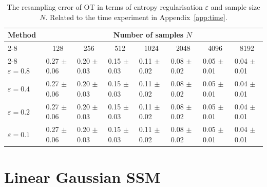 \documentclass{article}
\begin{document}
\begin{table}[t!]
    \caption{The resampling error of OT in terms of entropy regularisation $\varepsilon$ and sample size $N$. 
    Related to the time experiment in Appendix~\ref{app:time}.}
    \label{tbl:time-err-ot}
    \centering
    \begin{tabular}{@{}llllllll@{}}
    \toprule
    \multirow{2}{*}{Method}  & \multicolumn{7}{c}{Number of samples $N$}                                                                                                                                               \\ \cmidrule(l){2-8} 
                      & \multicolumn{1}{c}{128} & \multicolumn{1}{c}{256} & \multicolumn{1}{c}{512} & \multicolumn{1}{c}{1024} & \multicolumn{1}{c}{2048} & \multicolumn{1}{c}{4096} & \multicolumn{1}{c}{8192} \\ \cmidrule(l){2-8} 
    $\varepsilon=0.8$ & 0.27 $\pm$ 0.06         & 0.20 $\pm$ 0.03         & 0.15 $\pm$ 0.03         & 0.11 $\pm$ 0.02          & 0.08 $\pm$ 0.02          & 0.05 $\pm$ 0.01          & 0.04 $\pm$ 0.01          \\
    $\varepsilon=0.4$ & 0.27 $\pm$ 0.06         & 0.20 $\pm$ 0.03         & 0.15 $\pm$ 0.03         & 0.11 $\pm$ 0.02          & 0.08 $\pm$ 0.02          & 0.05 $\pm$ 0.01          & 0.04 $\pm$ 0.01          \\
    $\varepsilon=0.2$ & 0.27 $\pm$ 0.06         & 0.20 $\pm$ 0.03         & 0.15 $\pm$ 0.03         & 0.11 $\pm$ 0.02          & 0.08 $\pm$ 0.02          & 0.05 $\pm$ 0.01          & 0.04 $\pm$ 0.01          \\
    $\varepsilon=0.1$ & 0.27 $\pm$ 0.06         & 0.20 $\pm$ 0.03         & 0.15 $\pm$ 0.03         & 0.11 $\pm$ 0.02          & 0.08 $\pm$ 0.02          & 0.05 $\pm$ 0.01          & 0.04 $\pm$ 0.01          \\ \bottomrule
    \end{tabular}
\end{table}

\section{Linear Gaussian SSM}
\label{app:lgssm}
\end{document}
